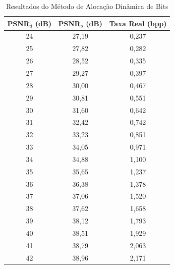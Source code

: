 \begin{table}[]
	\caption{Resultados do Método de Alocação Dinâmica de Bits}
			\centering
	\begin{tabular}{|c|c|c|}

		\hline
		\textbf{PSNR$_d$ (dB)} & \textbf{PSNR$_o$ (dB)} & \textbf{Taxa Real (bpp)} \\ \hline
		24                  & 27,19               & 0,237                    \\ \hline
		25                  & 27,82               & 0,282                    \\ \hline
		26                  & 28,52               & 0,335                    \\ \hline
		27                  & 29,27               & 0,397                    \\ \hline
		28                  & 30,00               & 0,467                    \\ \hline
		29                  & 30,81               & 0,551                    \\ \hline
		30                  & 31,60               & 0,642                    \\ \hline
		31                  & 32,42               & 0,742                    \\ \hline
		32                  & 33,23               & 0,851                    \\ \hline
		33                  & 34,05               & 0,971                    \\ \hline
		34                  & 34,88               & 1,100                    \\ \hline
		35                  & 35,65               & 1,237                    \\ \hline
		36                  & 36,38               & 1,378                    \\ \hline
		37                  & 37,06               & 1,520                    \\ \hline
		38                  & 37,62               & 1,658                    \\ \hline
		39                  & 38,12               & 1,793                    \\ \hline
		40                  & 38,51               & 1,929                    \\ \hline
		41                  & 38,79               & 2,063                    \\ \hline
		42                  & 38,96               & 2,171                    \\ \hline
	\end{tabular}
	\label{table:ba}
\end{table}


